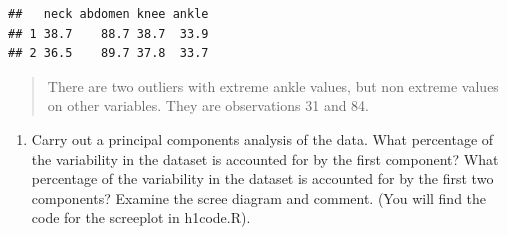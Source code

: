 \documentclass[]{article}
\newenvironment{Shaded}{\begin{snugshade}}{\end{snugshade}}
\newcommand{\ControlFlowTok}[1]{\textcolor[rgb]{0.13,0.29,0.53}{\textbf{#1}}}
\newcommand{\DataTypeTok}[1]{\textcolor[rgb]{0.13,0.29,0.53}{#1}}
\newcommand{\DecValTok}[1]{\textcolor[rgb]{0.00,0.00,0.81}{#1}}
\newcommand{\FloatTok}[1]{\textcolor[rgb]{0.00,0.00,0.81}{#1}}
\newcommand{\KeywordTok}[1]{\textcolor[rgb]{0.13,0.29,0.53}{\textbf{#1}}}
\newcommand{\NormalTok}[1]{#1}
\newcommand{\OperatorTok}[1]{\textcolor[rgb]{0.81,0.36,0.00}{\textbf{#1}}}
\newcommand{\OtherTok}[1]{\textcolor[rgb]{0.56,0.35,0.01}{#1}}
\newcommand{\StringTok}[1]{\textcolor[rgb]{0.31,0.60,0.02}{#1}}
\providecommand{\tightlist}{%
  \setlength{\itemsep}{0pt}\setlength{\parskip}{0pt}}
\begin{document}
\begin{Shaded}
\end{Shaded}

\begin{verbatim}
##   neck abdomen knee ankle
## 1 38.7    88.7 38.7  33.9
## 2 36.5    89.7 37.8  33.7
\end{verbatim}

\begin{quote}
There are two outliers with extreme ankle values, but non extreme values
on other variables. They are observations 31 and 84.
\end{quote}

\begin{enumerate}
\def\labelenumi{(\alph{enumi})}
\setcounter{enumi}{1}
\tightlist
\item
  Carry out a principal components analysis of the data. What percentage
  of the variability in the dataset is accounted for by the first
  component? What percentage of the variability in the dataset is
  accounted for by the first two components? Examine the scree diagram
  and comment. (You will find the code for the screeplot in h1code.R).
\end{enumerate}

\begin{Shaded}
\end{Shaded}
\end{document}
